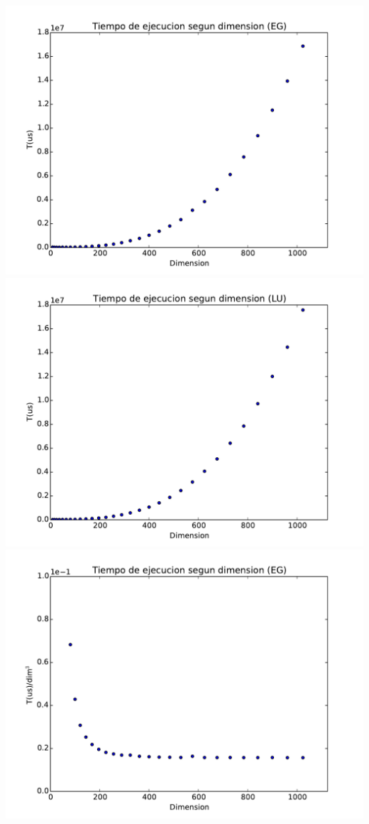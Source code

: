 \includegraphics[scale=0.45]{graficos/dimVariable_EG.pdf}
\includegraphics[scale=0.45]{graficos/dimVariable_LU.pdf}
\newline
\includegraphics[scale=0.45]{graficos/dimVariableDiv_EG.pdf}
